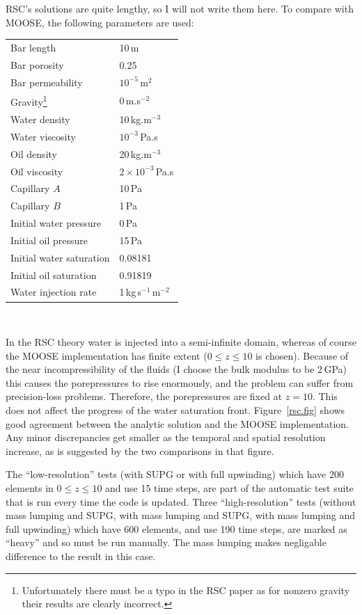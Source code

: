 \documentclass[]{scrreprt}
\begin{document}
RSC's solutions are quite lengthy, so I will not write them here.  To
compare with MOOSE, the following parameters are used:
\begin{center}
\begin{tabular}{|ll|}
\hline
Bar length & 10\,m \\
Bar porosity & 0.25 \\
Bar permeability & $10^{-5}$\,m$^{2}$ \\
\hline
Gravity\footnote{Unfortunately there must be a typo in the RSC paper
  as for nonzero gravity their results are clearly incorrect.} & 0\,m.s$^{-2}$ \\
\hline
Water density & 10\,kg.m$^{-3}$ \\
Water viscosity & $10^{-3}$\,Pa.s \\
\hline
Oil density & 20\,kg.m$^{-3}$ \\
Oil viscosity & $2\times 10^{-3}$\,Pa.s \\
\hline
Capillary $A$ & 10\,Pa \\
Capillary $B$ & 1\,Pa \\
\hline
Initial water pressure & 0\,Pa \\
Initial oil pressure & 15\,Pa \\
Initial water saturation & 0.08181 \\
Initial oil saturation & 0.91819 \\
\hline
Water injection rate & 1\,kg\,s$^{-1}$\,m$^{-2}$ \\
\hline
\end{tabular} \\
\end{center}

In the RSC theory water is injected into a semi-infinite domain,
whereas of course the MOOSE implementation has finite extent ($0\leq z
\leq 10$ is chosen).  Because of the near incompressibility of the
fluids (I choose the bulk modulus to be 2\,GPa) this causes the
porepressures to rise enormously, and the problem can suffer from
precision-loss problems.  Therefore, the porepressures are fixed at
$z=10$.  This does not affect the progress of the water saturation
front.  Figure~\ref{rsc.fig} shows good agreement between the analytic
solution and the MOOSE implementation.  Any minor discrepancies get
smaller as the temporal and spatial resolution increase, as is
suggested by the two comparisons in that figure.

The ``low-resolution'' tests (with SUPG or with full upwinding) which have 200 elements in $0\leq z\leq
10$ and use 15 time steps, are part of the automatic test suite that
is run every time the code is updated.  Three ``high-resolution'' tests
(without mass lumping and SUPG, with mass lumping and SUPG, with mass
lumping and full upwinding)
which have 600 elements, and use 190 time steps, are marked as
``heavy'' and so must be run manually.  The mass lumping makes
negligable difference to the result in this case.
\end{document}
